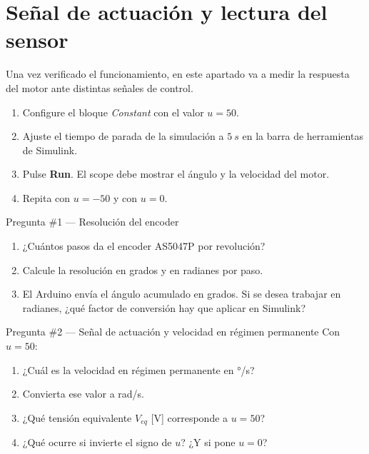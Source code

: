 \documentclass[12pt,a4paper]{article}
\begin{document}
\section{Señal de actuación y lectura del sensor}

Una vez verificado el funcionamiento, en este apartado va a medir la respuesta del
motor ante distintas señales de control.

\begin{enumerate}
  \item Configure el bloque \emph{Constant} con el valor $u = 50$.
  \item Ajuste el tiempo de parada de la simulación a $\SI{5}{s}$ en la barra de
        herramientas de Simulink.
  \item Pulse \textbf{Run}. El scope debe mostrar el ángulo y la velocidad del motor.
  \item Repita con $u = -50$ y con $u = 0$.
\end{enumerate}

\begin{pregunta}{Pregunta \#1 — Resolución del encoder}
  \begin{enumerate}[label=\alph*)]
    \item ¿Cuántos pasos da el encoder AS5047P por revolución?
    \item Calcule la resolución en grados y en radianes por paso.
    \item El Arduino envía el ángulo acumulado en grados. Si se desea trabajar en
          radianes, ¿qué factor de conversión hay que aplicar en Simulink?
  \end{enumerate}
\end{pregunta}

\begin{pregunta}{Pregunta \#2 — Señal de actuación y velocidad en régimen permanente}
  Con $u = 50$:
  \begin{enumerate}[label=\alph*)]
    \item ¿Cuál es la velocidad en régimen permanente en °/s?
    \item Convierta ese valor a rad/s.
    \item ¿Qué tensión equivalente $V_{eq}$ [V] corresponde a $u = 50$?
    \item ¿Qué ocurre si invierte el signo de $u$? ¿Y si pone $u = 0$?
  \end{enumerate}
\end{pregunta}
\end{document}
